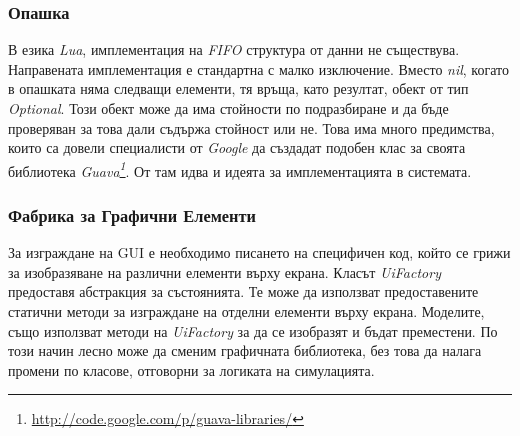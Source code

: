 		
		\subsubsection{Опашка}
		
		В езика \emph{Lua}, имплементация на \emph{FIFO} структура от данни не съществува. Направената имплементация
		е стандартна с малко изключение. Вместо \emph{nil}, когато в опашката няма следващи елементи, тя връща, като резултат, 
		обект от тип \emph{Optional}. Този обект може да има стойности по подразбиране и да бъде проверяван за това дали 
		съдържа стойност или не. Това има много предимства, които са довели специалисти от \emph{Google} да 
		създадат подобен клас за своята библиотека
		\emph{Guava\footnote{\url{http://code.google.com/p/guava-libraries/}}}. От там идва и идеята за имплементацията в системата.
		
		\subsubsection{Фабрика за Графични Елементи}
		
		За изграждане на \ac{GUI} е необходимо писането на специфичен код, който се грижи за изобразяване на различни елементи
		върху екрана. Класът \emph{UiFactory} предоставя абстракция за състоянията. Те може да използват предоставените статични методи за 	
		изграждане на отделни елементи върху екрана. Моделите, също използват методи на \emph{UiFactory} за да се изобразят и бъдат преместени.
		По този начин лесно може да сменим графичната библиотека, без това да налага промени по класове, отговорни за логиката на симулацията.